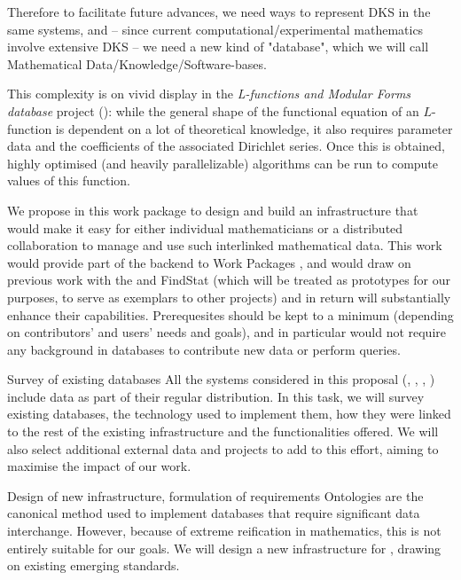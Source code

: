 \begin{Workpackage}{\thewpno}
\begin{WPDescription}
Therefore to facilitate future advances, we need ways to represent DKS in the same systems, and -- since current computational/experimental mathematics involve extensive DKS -- we need a new kind of "database", which we will call Mathematical Data/Knowledge/Software-bases.

This complexity is on vivid display in the \emph{L-functions and Modular Forms database} project (\LMFDB): while the general shape of the functional equation of an $L$-function is dependent on a lot of theoretical knowledge, it also requires parameter data and the coefficients of the associated Dirichlet series. Once this is obtained, highly optimised (and heavily parallelizable) algorithms can be run to compute values of this function. 

We propose in this work package to design and build an infrastructure that would make it easy for either individual mathematicians or a distributed collaboration to manage and use such interlinked mathematical data. This work would provide part of the backend to Work Packages , and would draw on previous work with the \LMFDB and FindStat (which will be treated as prototypes for our purposes, to serve as exemplars to other projects) and in return will substantially enhance their capabilities. Prerequesites should be kept to a minimum (depending on contributors' and users' needs and goals), and in particular would not require any background in databases to contribute new data or perform queries. 
\end{WPDescription}

\begin{task}{Survey of existing databases}
\label{task:data_assessment}
All the systems considered in this proposal (\GAP, \Sage, \Pari, \Singular) include data as part of their regular distribution. In this task, we will survey existing databases, the technology used to implement them, how they were linked to the rest of the existing infrastructure and the functionalities offered. We will also select additional external data and projects to add to this effort, aiming to maximise the impact of our work. 
\end{task}

\begin{task}{Design of new infrastructure, formulation of requirements}
\label{task:data_design}
Ontologies are the canonical method used to implement databases that require significant data interchange. However, because of extreme reification in mathematics, this is not entirely suitable for our goals. We will design a new infrastructure for \TheProject, drawing on existing emerging standards. 


\end{task}
\end{Workpackage}
